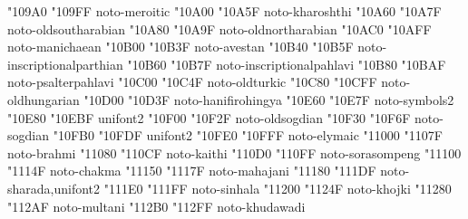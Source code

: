 \documentclass{article}
\begin{document}
                               { "109A0} { "109FF} {noto-meroitic}
                                     { "10A00} { "10A5F} {noto-kharoshthi}
                              { "10A60} { "10A7F} {noto-oldsoutharabian}
                              { "10A80} { "10A9F} {noto-oldnortharabian}
                                     { "10AC0} { "10AFF} {noto-manichaean}
                                        { "10B00} { "10B3F} {noto-avestan}
                         { "10B40} { "10B5F} {noto-inscriptionalparthian}
                          { "10B60} { "10B7F} {noto-inscriptionalpahlavi}
                                { "10B80} { "10BAF} {noto-psalterpahlavi}
                                     { "10C00} { "10C4F} {noto-oldturkic}
                                  { "10C80} { "10CFF} {noto-oldhungarian}
                                { "10D00} { "10D3F} {noto-hanifirohingya}
                           { "10E60} { "10E7F} {noto-symbols2}
                                         { "10E80} { "10EBF} {unifont2}
                                    { "10F00} { "10F2F} {noto-oldsogdian}
                                        { "10F30} { "10F6F} {noto-sogdian}
                                     { "10FB0} { "10FDF} {unifont2}
                                        { "10FE0} { "10FFF} {noto-elymaic}
                                         { "11000} { "1107F} {noto-brahmi}
                                         { "11080} { "110CF} {noto-kaithi}
                                   { "110D0} { "110FF} {noto-sorasompeng}
                                         { "11100} { "1114F} {noto-chakma}
                                       { "11150} { "1117F} {noto-mahajani}
                                        { "11180} { "111DF} {noto-sharada,unifont2}
                        { "111E0} { "111FF} {noto-sinhala}
                                         { "11200} { "1124F} {noto-khojki}
                                        { "11280} { "112AF} {noto-multani}
                                      { "112B0} { "112FF} {noto-khudawadi}
\end{document}
